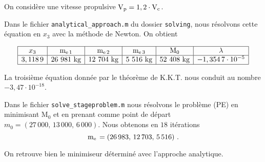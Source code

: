 \question On considère une vitesse propulsive $\mathrm{V}_{\mathrm{p}} = 1,2\cdot\mathrm{V}_{\mathrm{c}}$.

Dans le fichier \verb+analytical_approach.m+ du dossier \verb+solving+, nous résolvons cette équation en $x_3$ avec la méthode de Newton. On obtient

\begin{center}
\[\begin{array}{|c|c|c|c|c|c|}\hline
x_3 & \masspropel{1} & \masspropel{2} & \masspropel{3} & \mathrm{M}_{0} & \lambda\\\hline
3,118\,9 & 26\ 981\text{ kg}& 12\ 704\text{ kg} & 5\ 516\text{ kg} & 52\ 408\text{ kg} & -1,354\,7\cdot 10^{-5}\\\hline
\end{array}\]
\end{center}

La troisième équation donnée par le théorème de K.K.T. nous conduit au nombre $-3,47\cdot 10^{-18}$.

\question Dans le fichier \lstinline+solve_stageproblem.m+ nous résolvons le problème (PE) en minimisant $\mathrm{M}_0$ et en prenant comme point de départ $m_{0}=(27\,000,\,13\,000,\,6\,000)$. Nous obtenons en $18$ itérations
\[\mathrm{m}_{\mathrm{e}\,} = (26\,983,\,12\,703,\,5\,516)\text{ .}\]

On retrouve bien le minimiseur déterminé avec l'approche analytique.